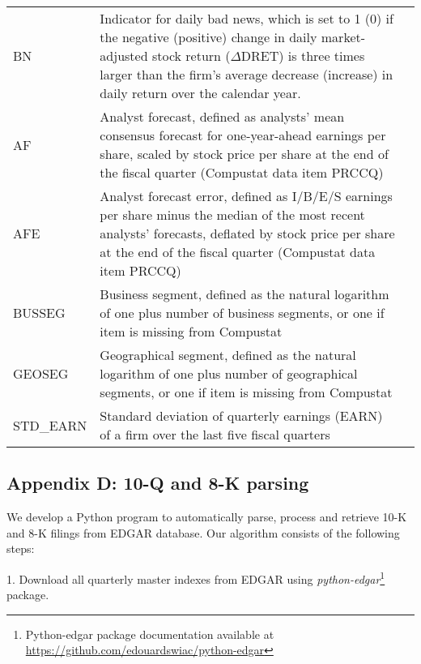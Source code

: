 \begin{table}[H]
\begin{tabular}{lp{15cm}p{15cm}}
		BN & Indicator for daily bad news, which is set to 1 (0) if the negative (positive) change in daily market-adjusted stock return ($\Delta$DRET) is three times larger than the firm’s average decrease (increase) in daily return over the calendar year.\\
		AF & Analyst forecast, defined as analysts' mean consensus forecast for one-year-ahead earnings per share, scaled by stock price per share at the end of the fiscal quarter (Compustat data item PRCCQ)\\
		AFE & Analyst forecast error, defined as I/B/E/S earnings per share minus the median of the most recent analysts' forecasts, deflated by stock price per share at the end of the fiscal quarter (Compustat data item PRCCQ)\\
		BUSSEG & Business segment, defined as the natural logarithm of one plus number of business segments, or one if item is missing from Compustat\\
		GEOSEG & Geographical segment, defined as the natural logarithm of one plus number of geographical segments, or one if item is missing from Compustat\\
		STD\_EARN & Standard deviation of quarterly earnings (EARN) of a firm over the last five fiscal quarters\\
		\bottomrule
		\bottomrule
	\end{tabular}%
\end{table}%

\newpage
\subsection*{Appendix D: 10-Q and 8-K parsing}
\setcounter{footnote}{0}
\label{appd}
We develop a Python program to automatically parse, process and retrieve 10-K and 8-K filings from EDGAR database. Our algorithm consists of the following steps:

1. Download all quarterly master indexes from EDGAR using \textit{python-edgar}\footnote{Python-edgar package documentation available at \url{https://github.com/edouardswiac/python-edgar}} package.

